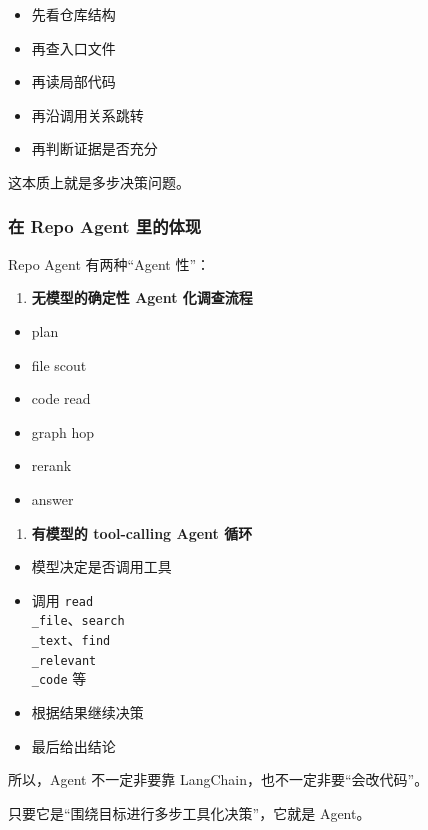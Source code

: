 \documentclass[UTF8,12pt,openany]{ctexbook}
\begin{document}
\begin{itemize}
\item 先看仓库结构
\item 再查入口文件
\item 再读局部代码
\item 再沿调用关系跳转
\item 再判断证据是否充分
\end{itemize}

这本质上就是多步决策问题。\par

\subsubsection{在 Repo Agent 里的体现}

Repo Agent 有两种“Agent 性”：\par

\begin{enumerate}
\item \textbf{无模型的确定性 Agent 化调查流程}
\end{enumerate}
\begin{itemize}
\item plan
\item file scout
\item code read
\item graph hop
\item rerank
\item answer
\end{itemize}

\begin{enumerate}
\item \textbf{有模型的 tool-calling Agent 循环}
\end{enumerate}
\begin{itemize}
\item 模型决定是否调用工具
\item 调用 \texttt{read\\_file}、\texttt{search\\_text}、\texttt{find\\_relevant\\_code} 等
\item 根据结果继续决策
\item 最后给出结论
\end{itemize}

所以，Agent 不一定非要靠 LangChain，也不一定非要“会改代码”。  \par
只要它是“围绕目标进行多步工具化决策”，它就是 Agent。\par
\end{document}
